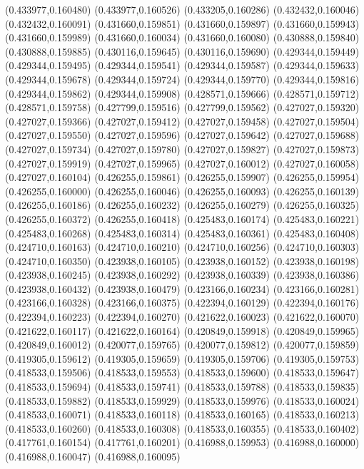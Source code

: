 (0.433977,0.160480)
(0.433977,0.160526)
(0.433205,0.160286)
(0.432432,0.160046)
(0.432432,0.160091)
(0.431660,0.159851)
(0.431660,0.159897)
(0.431660,0.159943)
(0.431660,0.159989)
(0.431660,0.160034)
(0.431660,0.160080)
(0.430888,0.159840)
(0.430888,0.159885)
(0.430116,0.159645)
(0.430116,0.159690)
(0.429344,0.159449)
(0.429344,0.159495)
(0.429344,0.159541)
(0.429344,0.159587)
(0.429344,0.159633)
(0.429344,0.159678)
(0.429344,0.159724)
(0.429344,0.159770)
(0.429344,0.159816)
(0.429344,0.159862)
(0.429344,0.159908)
(0.428571,0.159666)
(0.428571,0.159712)
(0.428571,0.159758)
(0.427799,0.159516)
(0.427799,0.159562)
(0.427027,0.159320)
(0.427027,0.159366)
(0.427027,0.159412)
(0.427027,0.159458)
(0.427027,0.159504)
(0.427027,0.159550)
(0.427027,0.159596)
(0.427027,0.159642)
(0.427027,0.159688)
(0.427027,0.159734)
(0.427027,0.159780)
(0.427027,0.159827)
(0.427027,0.159873)
(0.427027,0.159919)
(0.427027,0.159965)
(0.427027,0.160012)
(0.427027,0.160058)
(0.427027,0.160104)
(0.426255,0.159861)
(0.426255,0.159907)
(0.426255,0.159954)
(0.426255,0.160000)
(0.426255,0.160046)
(0.426255,0.160093)
(0.426255,0.160139)
(0.426255,0.160186)
(0.426255,0.160232)
(0.426255,0.160279)
(0.426255,0.160325)
(0.426255,0.160372)
(0.426255,0.160418)
(0.425483,0.160174)
(0.425483,0.160221)
(0.425483,0.160268)
(0.425483,0.160314)
(0.425483,0.160361)
(0.425483,0.160408)
(0.424710,0.160163)
(0.424710,0.160210)
(0.424710,0.160256)
(0.424710,0.160303)
(0.424710,0.160350)
(0.423938,0.160105)
(0.423938,0.160152)
(0.423938,0.160198)
(0.423938,0.160245)
(0.423938,0.160292)
(0.423938,0.160339)
(0.423938,0.160386)
(0.423938,0.160432)
(0.423938,0.160479)
(0.423166,0.160234)
(0.423166,0.160281)
(0.423166,0.160328)
(0.423166,0.160375)
(0.422394,0.160129)
(0.422394,0.160176)
(0.422394,0.160223)
(0.422394,0.160270)
(0.421622,0.160023)
(0.421622,0.160070)
(0.421622,0.160117)
(0.421622,0.160164)
(0.420849,0.159918)
(0.420849,0.159965)
(0.420849,0.160012)
(0.420077,0.159765)
(0.420077,0.159812)
(0.420077,0.159859)
(0.419305,0.159612)
(0.419305,0.159659)
(0.419305,0.159706)
(0.419305,0.159753)
(0.418533,0.159506)
(0.418533,0.159553)
(0.418533,0.159600)
(0.418533,0.159647)
(0.418533,0.159694)
(0.418533,0.159741)
(0.418533,0.159788)
(0.418533,0.159835)
(0.418533,0.159882)
(0.418533,0.159929)
(0.418533,0.159976)
(0.418533,0.160024)
(0.418533,0.160071)
(0.418533,0.160118)
(0.418533,0.160165)
(0.418533,0.160213)
(0.418533,0.160260)
(0.418533,0.160308)
(0.418533,0.160355)
(0.418533,0.160402)
(0.417761,0.160154)
(0.417761,0.160201)
(0.416988,0.159953)
(0.416988,0.160000)
(0.416988,0.160047)
(0.416988,0.160095)

